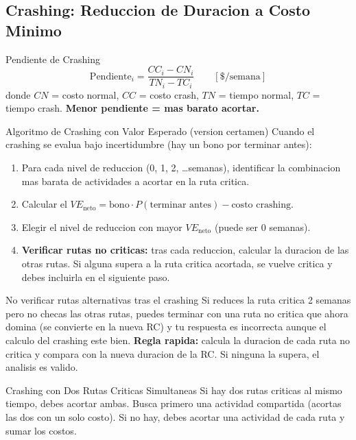 \documentclass[11pt, a4paper]{article}
\begin{document}
\subsection{Crashing: Reduccion de Duracion a Costo Minimo}

\begin{formulas}{Pendiente de Crashing}
  \[
    \text{Pendiente}_i = \frac{CC_i - CN_i}{TN_i - TC_i}
    \qquad [\$/\text{semana}]
  \]
  donde $CN$ = costo normal, $CC$ = costo crash, $TN$ = tiempo normal, $TC$ = tiempo crash.
  \textbf{Menor pendiente = mas barato acortar.}
\end{formulas}

\begin{tipprueba}{Algoritmo de Crashing con Valor Esperado (version certamen)}
  Cuando el crashing se evalua bajo incertidumbre (hay un bono por terminar antes):
  \begin{enumerate}[leftmargin=1.5em, itemsep=2pt]
    \item Para cada nivel de reduccion (0, 1, 2, \ldots semanas), identificar
          la combinacion mas barata de actividades a acortar en la ruta critica.
    \item Calcular el $VE_{\text{neto}} = \text{bono} \cdot P(\text{terminar antes}) - \text{costo crashing}$.
    \item Elegir el nivel de reduccion con mayor $VE_{\text{neto}}$ (puede ser 0 semanas).
    \item \textbf{Verificar rutas no criticas:} tras cada reduccion, calcular la duracion
          de las otras rutas. Si alguna supera a la ruta critica acortada, se vuelve critica
          y debes incluirla en el siguiente paso.
  \end{enumerate}
\end{tipprueba}

\begin{trampa}{No verificar rutas alternativas tras el crashing}
  Si reduces la ruta critica 2 semanas pero no checas las otras rutas,
  puedes terminar con una ruta no critica que ahora domina (se convierte en la nueva RC)
  y tu respuesta es incorrecta aunque el calculo del crashing este bien.
  \medskip
  \textbf{Regla rapida:} calcula la duracion de cada ruta no critica y compara con
  la nueva duracion de la RC. Si ninguna la supera, el analisis es valido.
\end{trampa}

\begin{trampa}{Crashing con Dos Rutas Criticas Simultaneas}
  Si hay dos rutas criticas al mismo tiempo, debes acortar ambas.
  Busca primero una actividad compartida (acortas las dos con un solo costo).
  Si no hay, debes acortar una actividad de cada ruta y sumar los costos.
\end{trampa}
\end{document}
